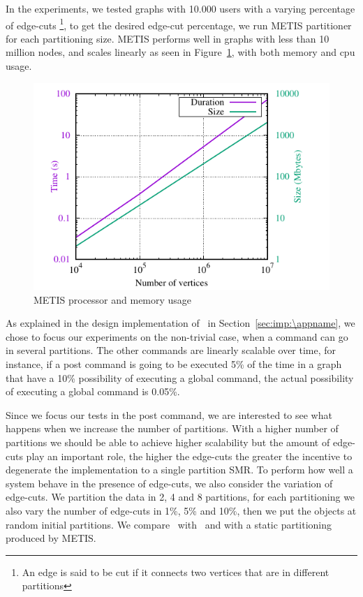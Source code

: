 In the experiments, we tested graphs with 10.000 users with a varying percentage of edge-cuts \footnote{An edge is said to be cut if it connects two vertices that are in different partitions}, to get the desired edge-cut
percentage, we run METIS partitioner for each partitioning size. METIS performs well in graphs with less than 10 million nodes, and scales linearly as seen in Figure~\ref{fig:metis_size_time}, with both memory and cpu usage.

\begin{figure}[ht!]
  \centering
    \includegraphics[width=\columnwidth]{figures/metis_size_time}
	\caption{METIS processor and memory usage}
	\label{fig:metis_size_time}
\end{figure}

As explained in the design implementation of \appname\ in Section~\ref{sec:imp:\appname}, we chose to focus our
experiments on the non-trivial case, when a command can go in several partitions. The other commands are linearly
scalable over time, for instance, if a post command is going to be executed 5\% of the time in a graph that have a 10\%
possibility of executing a global command, the actual possibility of executing a global command is 0.05\%.

Since we focus our tests in the post command, we are interested to see what happens when we increase the number of
partitions. With a higher number of partitions we should be able to achieve higher scalability but the amount of edge-cuts
play an important role, the higher the edge-cuts the greater the incentive to degenerate the implementation to a single
partition SMR. To perform how well a system behave in the presence of edge-cuts, we also consider the variation of
edge-cuts. We partition the data in 2, 4 and 8 partitions, for each partitioning we also vary the number of edge-cuts 
in 1\%, 5\% and 10\%, then we put the objects at random initial partitions. We compare \dynastar\ with \dssmr\ and \ssmr with a static partitioning produced by METIS.

